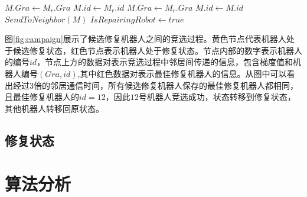 \begin{algorithm}
	\begin{algorithmic}[1]
					\State $M.Gra \gets M_r.Gra$
					\State $M.id \gets M_r.id$	
				\Else 
						\State $M.Gra \gets M_r.Gra$
						\State $M.id \gets M.id$
					\EndIf
				\EndIf
				\State $SendToNeighbor(M)$
			\Else 
					\State $IsRepairingRobot \gets true$
					\State {} 
				\EndIf	
			\EndIf			
		\EndFunction		
	\end{algorithmic}
\end{algorithm}

图\ref{fig:campaign}展示了候选修复机器人之间的竞选过程。黄色节点代表机器人处于候选修复状态，红色节点表示机器人处于修复状态。节点内部的数字表示机器人的编号$id$，节点上方的数据对表示竞选过程中邻居间传递的信息，包含梯度值和机器人编号$(Gra,id)$,其中红色数据对表示最佳修复机器人的信息。从图中可以看出经过3倍的邻居通信时间，所有候选修复机器人保存的最佳修复机器人都相同，且最佳修复机器人的$id = 12$，因此$12$号机器人竞选成功，状态转移到修复状态，其他机器人转移回原状态。
\begin{figure*}[!htbp]
	\centering
\end{figure*}
\subsection{修复状态}

\section{算法分析}
